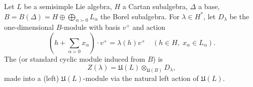 Let $L$ be a semisimple Lie algebra, $H$ a Cartan subalgebra, $\Delta$ a base, $B = B(\Delta) = H \oplus \bigoplus_{\alpha \succ 0} L_\alpha$ the Borel subalgebra. For $\lambda \in H^*$, let $D_\lambda$ be the one-dimensional $B$-module with basis $v^+$ and action
$$(h + \sum_{\alpha \succ 0} x_\alpha) \cdot v^+ = \lambda(h) v^+ \quad (h \in H,\; x_\alpha \in L_\alpha).$$
The  (or standard cyclic module induced from $B$) is
$$Z(\lambda) = \mathfrak{U}(L) \otimes_{\mathfrak{U}(B)} D_\lambda,$$
made into a (left) $\mathfrak{U}(L)$-module via the natural left action of $\mathfrak{U}(L)$.
